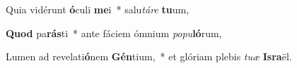 \item Quia vidérunt \textbf{ó}culi \textbf{me}i~* salu\textit{tá}\textit{re} \textbf{tu}um,
\item \textbf{Quod} pa\textbf{rás}ti~* ante fáciem ómnium \textit{po}\textit{pu}\textbf{ló}rum,
\item Lumen ad revelati\textbf{ó}nem \textbf{Gén}tium,~* et glóriam plebis \textit{tu}\textit{æ} \textbf{Is}\textbf{ra}ël.
